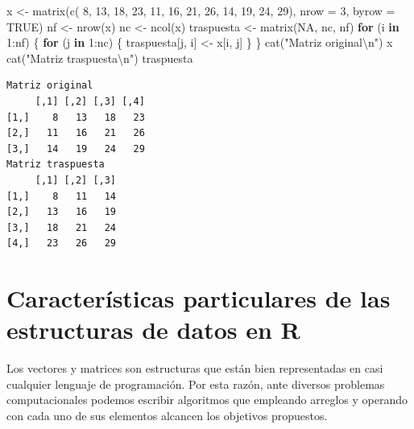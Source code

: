 \documentclass[
]{book}
\newenvironment{Shaded}{\begin{snugshade}}{\end{snugshade}}
\newcommand{\AttributeTok}[1]{\textcolor[rgb]{0.77,0.63,0.00}{#1}}
\newcommand{\ConstantTok}[1]{\textcolor[rgb]{0.00,0.00,0.00}{#1}}
\newcommand{\ControlFlowTok}[1]{\textcolor[rgb]{0.13,0.29,0.53}{\textbf{#1}}}
\newcommand{\DecValTok}[1]{\textcolor[rgb]{0.00,0.00,0.81}{#1}}
\newcommand{\FunctionTok}[1]{\textcolor[rgb]{0.00,0.00,0.00}{#1}}
\newcommand{\NormalTok}[1]{#1}
\newcommand{\OtherTok}[1]{\textcolor[rgb]{0.56,0.35,0.01}{#1}}
\newcommand{\SpecialCharTok}[1]{\textcolor[rgb]{0.00,0.00,0.00}{#1}}
\newcommand{\StringTok}[1]{\textcolor[rgb]{0.31,0.60,0.02}{#1}}
\begin{document}
\begin{Shaded}
\begin{Highlighting}[]
\NormalTok{x }\OtherTok{\textless{}{-}} \FunctionTok{matrix}\NormalTok{(}\FunctionTok{c}\NormalTok{( }\DecValTok{8}\NormalTok{, }\DecValTok{13}\NormalTok{, }\DecValTok{18}\NormalTok{, }\DecValTok{23}\NormalTok{, }
              \DecValTok{11}\NormalTok{, }\DecValTok{16}\NormalTok{, }\DecValTok{21}\NormalTok{, }\DecValTok{26}\NormalTok{, }
              \DecValTok{14}\NormalTok{, }\DecValTok{19}\NormalTok{, }\DecValTok{24}\NormalTok{, }\DecValTok{29}\NormalTok{), }
            \AttributeTok{nrow =} \DecValTok{3}\NormalTok{, }\AttributeTok{byrow =} \ConstantTok{TRUE}\NormalTok{)}
\NormalTok{nf }\OtherTok{\textless{}{-}} \FunctionTok{nrow}\NormalTok{(x)}
\NormalTok{nc }\OtherTok{\textless{}{-}} \FunctionTok{ncol}\NormalTok{(x)}
\NormalTok{traspuesta }\OtherTok{\textless{}{-}} \FunctionTok{matrix}\NormalTok{(}\ConstantTok{NA}\NormalTok{, nc, nf)}
\ControlFlowTok{for}\NormalTok{ (i }\ControlFlowTok{in} \DecValTok{1}\SpecialCharTok{:}\NormalTok{nf) \{}
    \ControlFlowTok{for}\NormalTok{ (j }\ControlFlowTok{in} \DecValTok{1}\SpecialCharTok{:}\NormalTok{nc) \{}
\NormalTok{        traspuesta[j, i] }\OtherTok{\textless{}{-}}\NormalTok{ x[i, j]}
\NormalTok{    \}}
\NormalTok{\}}
\FunctionTok{cat}\NormalTok{(}\StringTok{"Matriz original}\SpecialCharTok{\textbackslash{}n}\StringTok{"}\NormalTok{)}
\NormalTok{x}
\FunctionTok{cat}\NormalTok{(}\StringTok{"Matriz traspuesta}\SpecialCharTok{\textbackslash{}n}\StringTok{"}\NormalTok{)}
\NormalTok{traspuesta}
\end{Highlighting}
\end{Shaded}

\begin{verbatim}
Matriz original
     [,1] [,2] [,3] [,4]
[1,]    8   13   18   23
[2,]   11   16   21   26
[3,]   14   19   24   29
Matriz traspuesta
     [,1] [,2] [,3]
[1,]    8   11   14
[2,]   13   16   19
[3,]   18   21   24
[4,]   23   26   29
\end{verbatim}

\hypertarget{caracteruxedsticas-particulares-de-las-estructuras-de-datos-en-r}{%
\section{Características particulares de las estructuras de datos en R}\label{caracteruxedsticas-particulares-de-las-estructuras-de-datos-en-r}}

Los vectores y matrices son estructuras que están bien representadas en casi cualquier lenguaje de programación. Por esta razón, ante diversos problemas computacionales podemos escribir algoritmos que empleando arreglos y operando con cada uno de sus elementos alcancen los objetivos propuestos.
\end{document}
